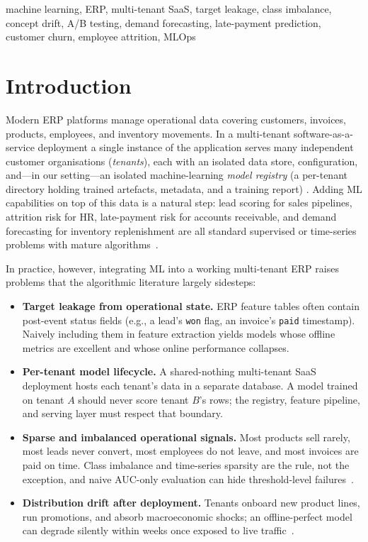 \documentclass[conference]{IEEEtran}
\begin{document}
\begin{IEEEkeywords}
machine learning, ERP, multi-tenant SaaS, target leakage, class imbalance,
concept drift, A/B testing, demand forecasting, late-payment prediction,
customer churn, employee attrition, MLOps
\end{IEEEkeywords}

\section{Introduction}
\label{sec:intro}

Modern ERP platforms manage operational data covering customers, invoices,
products, employees, and inventory movements. In a multi-tenant
software-as-a-service deployment a single instance of the application
serves many independent customer organisations (\emph{tenants}), each with
an isolated data store, configuration, and---in our setting---an isolated
machine-learning \emph{model registry} (a per-tenant directory holding
trained artefacts, metadata, and a training report)
\cite{bezemer2010multi,zhang2021multitenant}. Adding ML capabilities on top
of this data is a natural step: lead scoring for sales pipelines, attrition
risk for HR, late-payment risk for accounts receivable, and demand
forecasting for inventory replenishment are all standard supervised or
time-series problems with mature
algorithms~\cite{lessmann2015benchmarking,sakar2019machinelearning}.

In practice, however, integrating ML into a working multi-tenant ERP raises
problems that the algorithmic literature largely sidesteps:

\begin{itemize}
    \item \textbf{Target leakage from operational state.} ERP feature
    tables often contain post-event status fields (e.g., a lead's \texttt{won}
    flag, an invoice's \texttt{paid} timestamp). Naively including them in
    feature extraction yields models whose offline metrics are excellent and
    whose online performance collapses.
    \item \textbf{Per-tenant model lifecycle.} A shared-nothing multi-tenant
    SaaS deployment hosts each tenant's data in a separate database. A model
    trained on tenant $A$ should never score tenant $B$'s rows; the registry,
    feature pipeline, and serving layer must respect that boundary.
    \item \textbf{Sparse and imbalanced operational signals.} Most
    products sell rarely, most leads never convert, most employees do not
    leave, and most invoices are paid on time. Class imbalance and
    time-series sparsity are the rule, not the exception, and naive
    AUC-only evaluation can hide threshold-level
    failures~\cite{he2009imbalanced,saito2015prauc}.
    \item \textbf{Distribution drift after deployment.} Tenants onboard
    new product lines, run promotions, and absorb macroeconomic shocks; an
    offline-perfect model can degrade silently within weeks once exposed to
    live traffic~\cite{gama2014drift,sculley2015hidden}.
\end{itemize}
\end{document}
